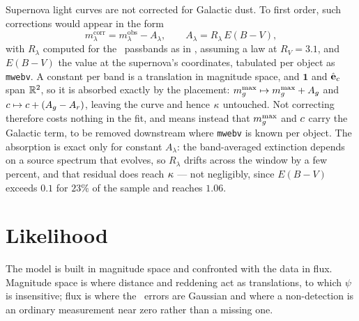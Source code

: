 \documentclass[11pt]{article}
\theoremstyle{plain}
\begin{document}
Supernova light curves are not corrected for Galactic dust.
To first order, such corrections would appear in the form
\begin{equation}
  m_{\lambda}^{\mathrm{corr}} = m_{\lambda}^{\mathrm{obs}} - A_{\lambda},
  \qquad A_{\lambda} = R_{\lambda}\,E(B-V) ,
  \label{eq:mwext}
\end{equation}
with $R_{\lambda}$ computed for the \ztf\ passbands as in \citet{Schlafly2011}, assuming a
\citet{Fitzpatrick1999} law at
$R_{V} = 3.1$, and $E(B-V)$ the \citet{Schlegel1998} value at the supernova's coordinates,
tabulated per object as \texttt{mwebv}. A constant per band is a translation in magnitude
space, and $\mathbf{1}$ and $\hat{\mathbf{e}}_{c}$ span $\mathbb{R}^{2}$, so it is absorbed exactly by the
placement: $m_{g}^{\max} \mapsto m_{g}^{\max} + A_{g}$ and
$c \mapsto c + (A_{g} - A_{r})$, leaving the curve and hence $\kappa$ untouched.
Not correcting therefore costs nothing in the fit, and means instead that $m_{g}^{\max}$ and
$c$ carry the Galactic term, to be removed downstream where \texttt{mwebv} is known
per object. The absorption is exact only for constant $A_{\lambda}$: the band-averaged
extinction depends on a source spectrum that evolves, so $R_{\lambda}$ drifts across the
window by a few percent, and that residual does reach $\kappa$ --- not negligibly, since
$E(B-V)$ exceeds $0.1$ for $23\%$ of the sample and reaches $1.06$.

\section{Likelihood}
\label{sec:likelihood}

The model is built in magnitude space and confronted with the data in flux. Magnitude space
is where distance and reddening act as translations, to which $\psi$ is insensitive; flux is
where the \ztf\ errors are Gaussian and where a non-detection is an ordinary measurement
near zero rather than a missing one.
\end{document}
